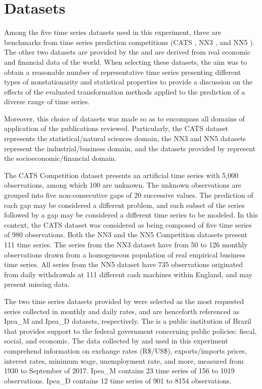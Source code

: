 \documentclass[11pt]{dippg}
\begin{document}
\section{Datasets} \label{datasets}

Among the five time series datasets used in this experiment, three are benchmarks from time series prediction competitions (CATS \cite{lendasse_time_2007}, NN3 \cite{nn3_nn3_2007}, and NN5 \cite{nn5_nn5_2008}). The other two datasets are provided by the  \cite{ipea_ipeadata._2017} and are derived from real economic and financial data of the world. When selecting these datasets, the aim was to obtain a reasonable number of representative time series presenting different types of nonstationarity and statistical properties to provide a discussion on the effects of the evaluated transformation methods applied to the prediction of a diverse range of time series.

Moreover, this choice of datasets was made so as to encompass all domains of application of the publications reviewed. Particularly, the CATS dataset represents the statistical/natural sciences domain, the NN3 and NN5 datasets represent the industrial/business domain, and the datasets provided by  represent the socioeconomic/financial domain. 

The CATS Competition dataset presents an artificial time series with 5,000 observations, among which 100 are unknown. The unknown observations are grouped into five non-consecutive gaps of 20 successive values. The prediction of each gap may be considered a different problem, and each subset of the series followed by a gap may be considered a different time series to be modeled. In this context, the CATS dataset was considered as being composed of five time series of 980 observations. Both the NN3 and the NN5 Competition datasets present 111 time series. The series from the NN3 dataset have from 50 to 126 monthly observations drawn from a homogeneous population of real empirical business time series. All series from the NN5 dataset have 735 observations originated from daily withdrawals at 111 different cash machines within England, and may present missing data.

The two time series datasets provided by  were selected as the most requested series collected in monthly and daily rates, and are henceforth referenced as Ipea\_M and Ipea\_D datasets, respectively. The  is a public institution of Brazil that provides support to the federal government concerning public policies: fiscal, social, and economic. The data collected by  and used in this experiment comprehend information on exchange rates (R\$/US\$), exports/imports prices, interest rates, minimum wage, unemployment rate, and more, measured from 1930 to September of 2017. Ipea\_M contains 23 time series of 156 to 1019 observations. Ipea\_D contains 12 time series of 901 to 8154 observations.
\end{document}
